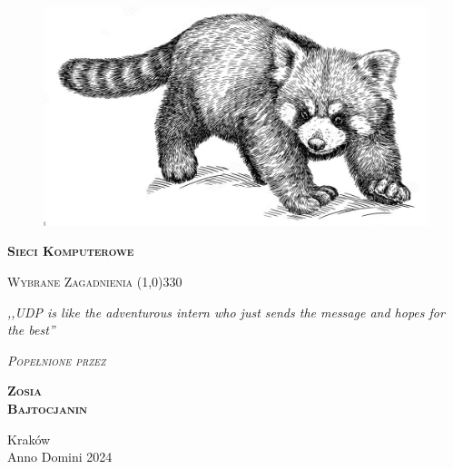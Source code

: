 \begin{titlepage} 
    \begin{center}
         \begin{figure}[h]
            \centering
           \includegraphics[width=\linewidth]{panda.jpg}
        \end{figure}
        
        \Huge
        \textbf{\textsc{Sieci Komputerowe}}
        
        \vspace{0.5cm}
        \Large
        \textsc{Wybrane Zagadnienia}
        \line(1,0){330}
        
        \normalsize
        
        \vspace{1cm}
        \textit{,,UDP is like the adventurous intern who just sends the message and hopes for the best''}
        \vspace{1cm}

        \textit{\textsc{Popełnione przez}}\\
        \vspace{5mm}
  
        \textbf{\textsc{Zosia \\Bajtocjanin}}
 
        \vfill

        Kraków \\
        Anno Domini 2024
    \end{center}
\end{titlepage}